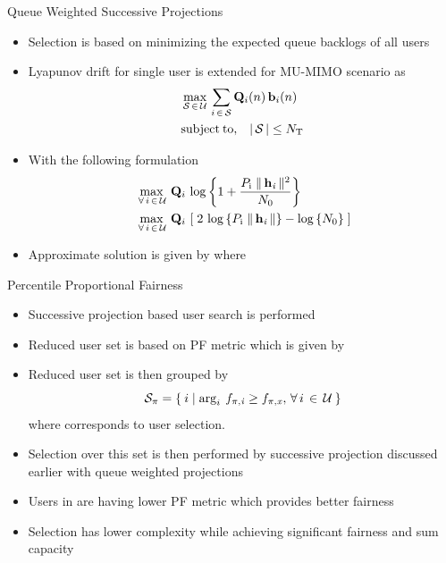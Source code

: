 \documentclass{beamer}
\begin{document}
\begin{frame}
\begin{block}{Queue Weighted Successive Projections}
\begin{itemize}
  \item Selection is based on minimizing the expected queue backlogs of all users
  \item Lyapunov drift \cite{neely2010stochastic} for single user is extended for MU-MIMO scenario as
  \begin{eqnarray*}
  &\displaystyle \max_{\mathcal{S} \, \in \, \mathcal{U}} \, \sum_{i \, \in \, \mathcal{S}}\mathbf{Q}_i(n) \, \mathbf{b}_i(n) \\
  &\displaystyle \mathrm{subject \: to,} \quad | \, \mathcal{S} \, | \leq N_{\mathrm{T}}
  \end{eqnarray*}
  \item With the following formulation
  \begin{eqnarray*}
  &\displaystyle \max_{\, \forall \, i \, \in \, \mathcal{U}} \, \mathbf{Q}_i \, \log \left \lbrace 1 + \frac{P_{\mathrm{i}} \; \|\, \mathbf{h}_{\mathit{i}} \,\|^2}{N_{\mathrm{0}}} \right \rbrace \\
  &\displaystyle \max_{\, \forall \, i \, \in \, \mathcal{U}} \, \mathbf{Q}_i \, \left [ \; 2 \, \log \left \lbrace P_{\mathrm{i}} \; \|\, \mathbf{h}_{\mathit{i}} \,\| \right \rbrace - \log \left \lbrace N_{\mathrm{0}} \right \rbrace \; \right ]
  \end{eqnarray*}
  \item Approximate solution is given by  where 
\end{itemize}
\end{block}
\end{frame}

\begin{frame}
\begin{block}{Percentile Proportional Fairness}
\begin{itemize}
  \item Successive projection based user search is performed
  \item Reduced user set is based on PF metric which is given by 
  \item Reduced user set  is then grouped by
  \begin{equation*}
  \mathcal{S}_\pi = \left \lbrace \: i \mid \arg_i \: {f}_{\mathit{\pi},\mathit{i}} \geq {f}_{\mathit{\pi},\mathit{x}}, \, \forall \, i \, \in \, \mathcal{U} \: \right \rbrace
  \end{equation*}
  where  corresponds to  user selection.
  \item Selection over this set is then performed by successive projection discussed earlier with queue weighted projections
  \item Users in  are having lower PF metric which provides better fairness
  \item Selection has lower complexity while achieving significant fairness and sum capacity
\end{itemize}
\end{block}
\end{frame}
\end{document}
